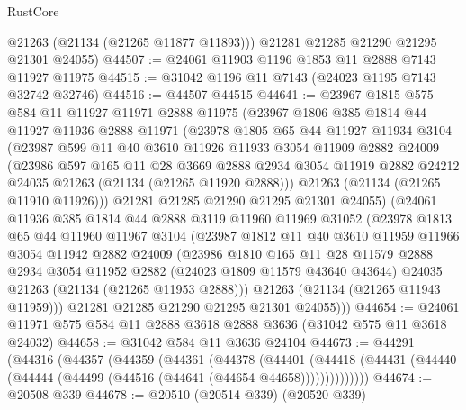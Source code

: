 \begin{lexlean}{RustCore}
\begin{coremodule}
        @21263
        (@21134 (@21265 @11877 @11893)))
      @21281
      @21285
      @21290
      @21295
      @21301
      @24055)
@44507 := @24061 @11903 @1196 @1853 @11 @2888 @7143 @11927 @11975
@44515 := @31042 @1196 @11 @7143 (@24023 @1195 @7143 @32742 @32746)
@44516 := @44507 @44515
@44641 := @23967
    @1815
    @575
    @584
    @11
    @11927
    @11971
    @2888
    @11975
    (@23967
      @1806
      @385
      @1814
      @44
      @11927
      @11936
      @2888
      @11971
      (@23978
        @1805
        @65
        @44
        @11927
        @11934
        @3104
        (@23987
          @599
          @11
          @40
          @3610
          @11926
          @11933
          @3054
          @11909
          @2882
          @24009
          (@23986
            @597
            @165
            @11
            @28
            @3669
            @2888
            @2934
            @3054
            @11919
            @2882
            @24212
            @24035
            @21263
            (@21134 (@21265 @11920 @2888)))
          @21263
          (@21134 (@21265 @11910 @11926)))
        @21281
        @21285
        @21290
        @21295
        @21301
        @24055)
      (@24061
        @11936
        @385
        @1814
        @44
        @2888
        @3119
        @11960
        @11969
        @31052
        (@23978
          @1813
          @65
          @44
          @11960
          @11967
          @3104
          (@23987
            @1812
            @11
            @40
            @3610
            @11959
            @11966
            @3054
            @11942
            @2882
            @24009
            (@23986
              @1810
              @165
              @11
              @28
              @11579
              @2888
              @2934
              @3054
              @11952
              @2882
              (@24023 @1809 @11579 @43640 @43644)
              @24035
              @21263
              (@21134 (@21265 @11953 @2888)))
            @21263
            (@21134 (@21265 @11943 @11959)))
          @21281
          @21285
          @21290
          @21295
          @21301
          @24055)))
@44654 := @24061 @11971 @575 @584 @11 @2888 @3618 @2888 @3636 (@31042 @575 @11 @3618 @24032)
@44658 := @31042 @584 @11 @3636 @24104
@44673 := @44291
    (@44316
      (@44357
        (@44359
          (@44361
            (@44378
              (@44401
                (@44418 (@44431 (@44440 (@44444 (@44499 (@44516 (@44641 (@44654 @44658))))))))))))))
@44674 := @20508 @339
@44678 := @20510 (@20514 @339) (@20520 @339)

\end{coremodule}
\end{lexlean}
